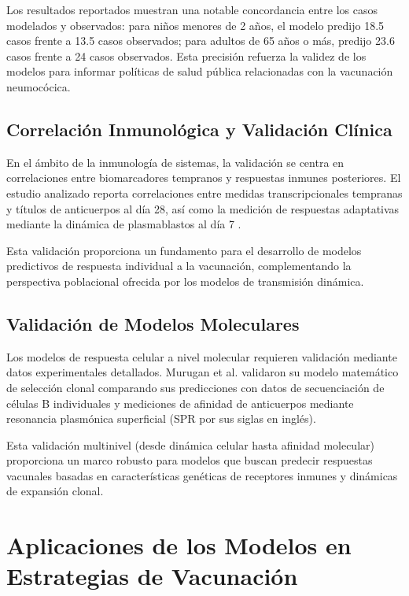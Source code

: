 Los resultados reportados muestran una notable concordancia entre los casos modelados y observados: para niños menores de 2 años, el modelo predijo 18.5 casos frente a 13.5 casos observados; para adultos de 65 años o más, predijo 23.6 casos frente a 24 casos observados. Esta precisión refuerza la validez de los modelos para informar políticas de salud pública relacionadas con la vacunación neumocócica.

\subsection{Correlación Inmunológica y Validación Clínica}

En el ámbito de la inmunología de sistemas, la validación se centra en correlaciones entre biomarcadores tempranos y respuestas inmunes posteriores. El estudio analizado reporta correlaciones entre medidas transcripcionales tempranas y títulos de anticuerpos al día 28, así como la medición de respuestas adaptativas mediante la dinámica de plasmablastos al día 7 \cite{Obermoser2013}.

Esta validación proporciona un fundamento para el desarrollo de modelos predictivos de respuesta individual a la vacunación, complementando la perspectiva poblacional ofrecida por los modelos de transmisión dinámica.

\subsection{Validación de Modelos Moleculares}

Los modelos de respuesta celular a nivel molecular requieren validación mediante datos experimentales detallados. Murugan et al. \cite{Murugan2018} validaron su modelo matemático de selección clonal comparando sus predicciones con datos de secuenciación de células B individuales y mediciones de afinidad de anticuerpos mediante resonancia plasmónica superficial (SPR por sus siglas en inglés).

Esta validación multinivel (desde dinámica celular hasta afinidad molecular) proporciona un marco robusto para modelos que buscan predecir respuestas vacunales basadas en características genéticas de receptores inmunes y dinámicas de expansión clonal.

\section{Aplicaciones de los Modelos en Estrategias de Vacunación}

